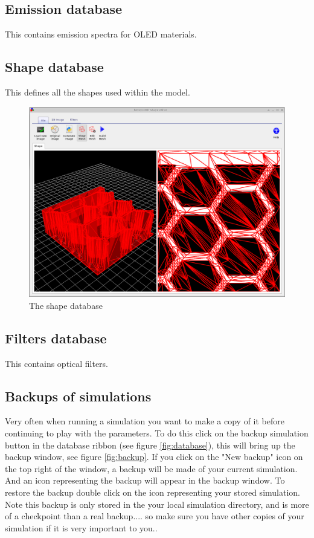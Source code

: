 \subsection{Emission database}
This contains emission spectra for OLED materials.

\subsection{Shape database}
\label{sec:shapedatabase}
This defines all the shapes used within the model.

\begin{figure}[H]
\centering
\includegraphics[width=\textwidth,height=0.7\textwidth]{./images/shape_db.png}
\caption{The shape database}
\label{fig:shapedb}
\end{figure}

\subsection{Filters database}
This contains optical filters.

\subsection{Backups of simulations}
Very often when running a simulation you want to make a copy of it before continuing to play with the parameters.  To do this click on the backup simulation button in the database ribbon (see figure \ref{fig:database}), this will bring up the backup window, see figure \ref{fig:backup}. If you click on the "New backup" icon on the top right of the window, a backup will be made of your current simulation.  And an icon representing the backup will appear in the backup window.  To restore the backup double click on the icon representing your stored simulation. Note this backup is only stored in the your local simulation directory, and is more of a checkpoint than a real backup.... so make sure you have other copies of your simulation if it is very important to you..

